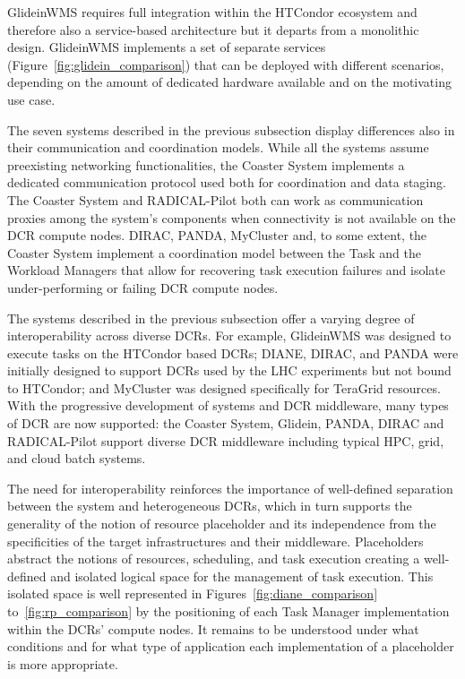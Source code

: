 \documentclass{sig-alternate}
\begin{document}
GlideinWMS requires full integration within the HTCondor ecosystem and therefore
also a service-based architecture but it departs from a monolithic design.
GlideinWMS implements a set of separate services
(Figure~\ref{fig:glidein_comparison}) that can be deployed with different
scenarios, depending on the amount of dedicated hardware available and on the
motivating use case.

The seven \pilot systems described in the previous subsection display
differences also in their communication and coordination models. While all the
\pilot systems assume preexisting networking functionalities, the Coaster System
implements a dedicated communication protocol used both for coordination and
data staging. The Coaster System and RADICAL-Pilot both can work as
communication proxies among the \pilot system's components when connectivity is
not available on the DCR compute nodes. DIRAC, PANDA, MyCluster and, to some
extent, the Coaster System implement a coordination model between the Task and
the Workload Managers that allow for recovering task execution failures and
isolate under-performing or failing DCR compute nodes.

The \pilot systems described in the previous subsection offer a varying degree
of interoperability across diverse DCRs.  For example, GlideinWMS was designed
to execute tasks on the HTCondor based DCRs; DIANE, DIRAC, and PANDA were
initially designed to support DCRs used by the LHC experiments but not bound to
HTCondor; and MyCluster was designed specifically for TeraGrid resources. With
the progressive development of \pilot systems and DCR middleware, many types of
DCR are now supported: the Coaster System, Glidein, PANDA, DIRAC and
RADICAL-Pilot support diverse DCR middleware including typical HPC, grid, and
cloud batch systems.


The need for interoperability reinforces the importance of well-defined
separation between the \pilot system and heterogeneous DCRs, which in turn
supports the generality of the notion of resource placeholder and its
independence from the specificities of the target infrastructures and their
middleware. Placeholders abstract the notions of resources, scheduling, and task
execution creating a well-defined and isolated logical space for the management
of task execution. This isolated space is well represented in
Figures~\ref{fig:diane_comparison} to~\ref{fig:rp_comparison} by the positioning
of each Task Manager implementation within the DCRs' compute nodes. It remains
to be understood under what conditions and for what type of application each
implementation of a placeholder is more appropriate.
\end{document}
